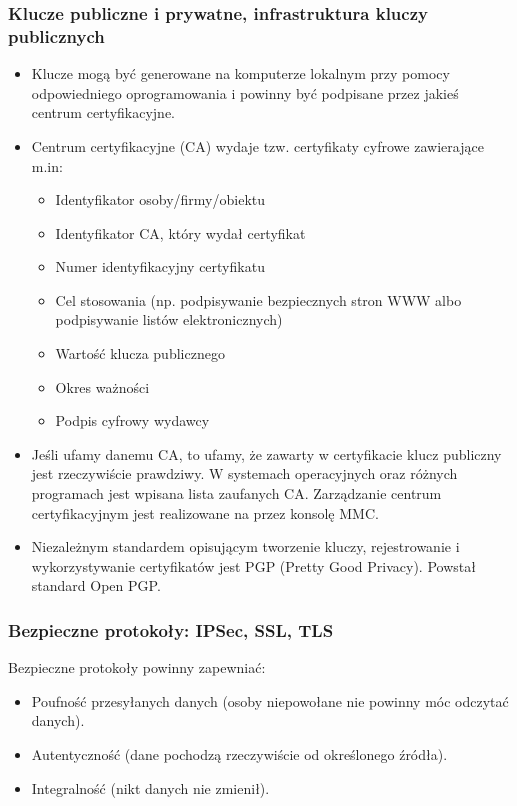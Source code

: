 \documentclass[../main.tex]{subfiles}
\begin{document}
\subsubsection{Klucze publiczne i prywatne, infrastruktura kluczy publicznych}
\begin{itemize}
    \item Klucze mogą być generowane na komputerze
    lokalnym przy pomocy odpowiedniego oprogramowania i powinny być podpisane przez
    jakieś centrum certyfikacyjne.
    \item Centrum certyfikacyjne (CA) wydaje tzw. certyfikaty cyfrowe zawierające m.in:
    \begin{itemize}
        \item Identyfikator osoby/firmy/obiektu
        \item Identyfikator CA, który wydał certyfikat
        \item Numer identyfikacyjny certyfikatu
        \item Cel stosowania (np. podpisywanie bezpiecznych stron WWW albo podpisywanie listów elektronicznych)
        \item Wartość klucza publicznego
        \item Okres ważności
        \item Podpis cyfrowy wydawcy
    \end{itemize}
    \item Jeśli ufamy danemu CA, to ufamy, że zawarty w certyfikacie klucz publiczny jest rzeczywiście prawdziwy.
    W systemach operacyjnych oraz różnych programach
    jest wpisana lista zaufanych CA.
    Zarządzanie centrum certyfikacyjnym jest realizowane na przez konsolę MMC.
    \item Niezależnym standardem opisującym tworzenie kluczy, rejestrowanie i wykorzystywanie
    certyfikatów jest PGP (Pretty Good Privacy). Powstał standard Open PGP.

\end{itemize}

\subsubsection{Bezpieczne protokoły: IPSec, SSL, TLS}

Bezpieczne protokoły powinny zapewniać:
\begin{itemize}
    \item Poufność przesyłanych danych (osoby niepowołane nie powinny móc odczytać danych).
    \item Autentyczność (dane pochodzą rzeczywiście od określonego źródła).
    \item Integralność (nikt danych nie zmienił).
\end{itemize}
\end{document}
